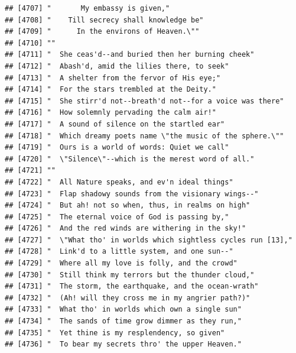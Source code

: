 \documentclass{article}\usepackage[]{graphicx}\usepackage[]{color}
\makeatletter
\newenvironment{kframe}{%
 \def\at@end@of@kframe{}%
 \ifinner\ifhmode%
  \def\at@end@of@kframe{\end{minipage}}%
  \begin{minipage}{\columnwidth}%
 \fi\fi%
 \def\FrameCommand##1{\hskip\@totalleftmargin \hskip-\fboxsep
 \colorbox{shadecolor}{##1}\hskip-\fboxsep
     \hskip-\linewidth \hskip-\@totalleftmargin \hskip\columnwidth}%
 \MakeFramed {\advance\hsize-\width
   \@totalleftmargin\z@ \linewidth\hsize
   \@setminipage}}%
 {\par\unskip\endMakeFramed%
 \at@end@of@kframe}
\newenvironment{knitrout}{}{} %
\makeatother
\begin{document}
\begin{knitrout}
\begin{kframe}
\begin{verbatim}
## [4707] "       My embassy is given,"                                                 
## [4708] "    Till secrecy shall knowledge be"                                         
## [4709] "      In the environs of Heaven.\""                                          
## [4710] ""                                                                            
## [4711] "  She ceas'd--and buried then her burning cheek"                             
## [4712] "  Abash'd, amid the lilies there, to seek"                                   
## [4713] "  A shelter from the fervor of His eye;"                                     
## [4714] "  For the stars trembled at the Deity."                                      
## [4715] "  She stirr'd not--breath'd not--for a voice was there"                      
## [4716] "  How solemnly pervading the calm air!"                                      
## [4717] "  A sound of silence on the startled ear"                                    
## [4718] "  Which dreamy poets name \"the music of the sphere.\""                      
## [4719] "  Ours is a world of words: Quiet we call"                                   
## [4720] "  \"Silence\"--which is the merest word of all."                             
## [4721] ""                                                                            
## [4722] "  All Nature speaks, and ev'n ideal things"                                  
## [4723] "  Flap shadowy sounds from the visionary wings--"                            
## [4724] "  But ah! not so when, thus, in realms on high"                              
## [4725] "  The eternal voice of God is passing by,"                                   
## [4726] "  And the red winds are withering in the sky!"                               
## [4727] "  \"What tho' in worlds which sightless cycles run [13],"                    
## [4728] "  Link'd to a little system, and one sun--"                                  
## [4729] "  Where all my love is folly, and the crowd"                                 
## [4730] "  Still think my terrors but the thunder cloud,"                             
## [4731] "  The storm, the earthquake, and the ocean-wrath"                            
## [4732] "  (Ah! will they cross me in my angrier path?)"                              
## [4733] "  What tho' in worlds which own a single sun"                                
## [4734] "  The sands of time grow dimmer as they run,"                                
## [4735] "  Yet thine is my resplendency, so given"                                    
## [4736] "  To bear my secrets thro' the upper Heaven."                                

\end{verbatim}
\end{kframe}
\end{knitrout}
\end{document}

